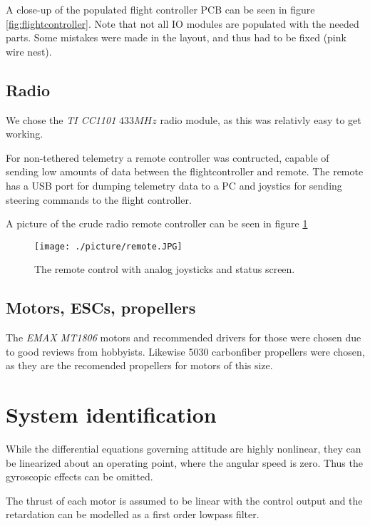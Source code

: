 A close-up of the populated flight controller PCB can be seen in figure
\ref{fig:flightcontroller}. Note that not all IO modules are populated with the
needed parts. Some mistakes were made in the layout, and thus had to be fixed
(pink wire nest).

\subsection{ Radio }
We chose the \emph{TI CC1101} $433MHz$ radio module, as this was relativly easy
to get working.

For non-tethered telemetry a remote controller was contructed, capable of
sending low amounts of data between the flightcontroller and remote. The remote
has a USB port for dumping telemetry data to a PC and joystics for sending
steering commands to the flight controller.

A picture of the crude radio remote controller can be seen in figure
\ref{fig:remote}

\begin{figure}
	\centering
	\texttt{[image: ./picture/remote.JPG]}
	\caption{The remote control with analog joysticks and status screen.}
	\label{fig:remote}
\end{figure}

\subsection{ Motors, ESCs, propellers }
The \emph{EMAX MT1806} motors
and recommended drivers for those were chosen due to good reviews from
hobbyists. Likewise 5030 carbonfiber propellers were chosen, as they are the
recomended propellers for motors of this size.

\section{ System identification } %
While the differential equations governing attitude are highly nonlinear,
they can be linearized about an operating point, where the angular speed is zero.
Thus the gyroscopic effects can be omitted.

The thrust of each motor is assumed to be linear with the control output and the
retardation can be modelled as a first order lowpass filter.


